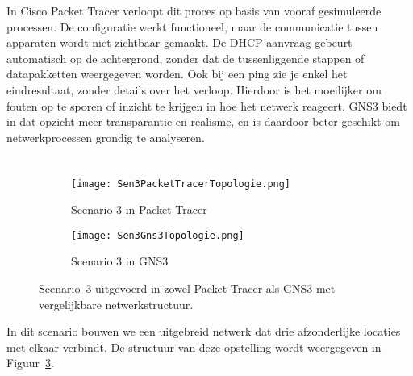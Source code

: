 \vspace{0.3cm}

In Cisco Packet Tracer verloopt dit proces op basis van vooraf gesimuleerde processen. De configuratie werkt functioneel, maar de communicatie tussen apparaten wordt niet zichtbaar gemaakt. De DHCP-aanvraag gebeurt automatisch op de achtergrond, zonder dat de tussenliggende stappen of datapakketten weergegeven worden. Ook bij een ping zie je enkel het eindresultaat, zonder details over het verloop. Hierdoor is het moeilijker om fouten op te sporen of inzicht te krijgen in hoe het netwerk reageert. GNS3 biedt in dat opzicht meer transparantie en realisme, en is daardoor beter geschikt om netwerkprocessen grondig te analyseren.






\section{}
\label{sec:scenario3}

\subsection{}
\label{sec:topologie-scenario3}

\begin{figure}[H]
    \centering
    \begin{subfigure}[b]{0.48\textwidth}
        \texttt{[image: Sen3PacketTracerTopologie.png]}
        \caption{Scenario 3 in Packet Tracer}
        \label{fig:pt_scenario3}
    \end{subfigure}
    \hfill
    \begin{subfigure}[b]{0.48\textwidth}
        \texttt{[image: Sen3Gns3Topologie.png]}
        \caption{Scenario 3 in GNS3}
        \label{fig:gns3_scenario3}
    \end{subfigure}
    \caption[Scenario 3 in beide tools.]{\label{fig:scenario3}Scenario~3 uitgevoerd in zowel Packet Tracer als GNS3 met vergelijkbare netwerkstructuur.}
\end{figure}



In dit scenario bouwen we een uitgebreid netwerk dat drie afzonderlijke locaties met elkaar verbindt. De structuur van deze opstelling wordt weergegeven in Figuur~\ref{fig:scenario3}.

